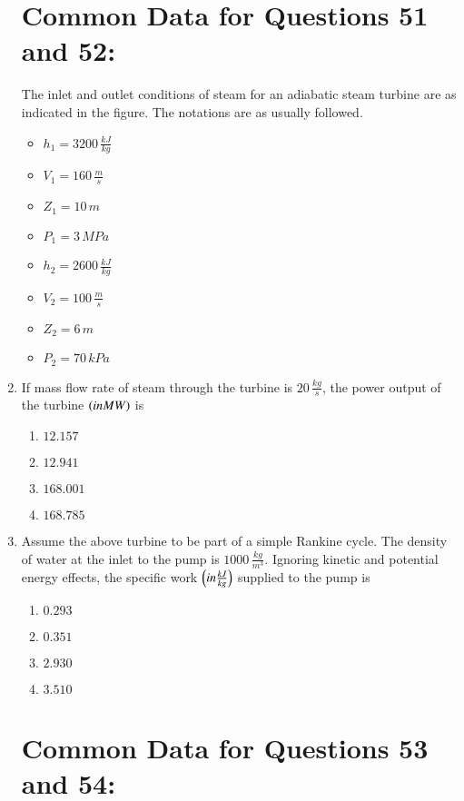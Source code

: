 \documentclass[journal,12pt,twocolumn]{IEEEtran}
\theoremstyle{remark}
\begin{document}
\begin{enumerate}[start=49]
  \section{  Common Data for Questions 51 and 52:}
    
    The inlet and outlet conditions of steam for an adiabatic steam turbine are as indicated in the figure. The notations are as usually followed.
    
    \begin{itemize}
        \item $h_1 = 3200 \, \frac{kJ}{kg}$
        \item $V_1 = 160 \, \frac{m}{s}$
        \item $Z_1 = 10 \, m$
        \item $P_1 = 3 \, MPa$
        \item $h_2 = 2600 \, \frac{kJ}{kg}$
        \item $V_2 = 100 \, \frac{m}{s}$
        \item $Z_2 = 6 \, m$
        \item $P_2 = 70 \, kPa$
    \end{itemize}

    \item If mass flow rate of steam through the turbine is $20 \, \frac{kg}{s}$, the power output of the turbine $\left(in 
 MW\right)$ is
    \begin{enumerate}
        \item $12.157$
        \item $12.941$
        \item $168.001$
        \item $168.785$
    \end{enumerate}

    \item Assume the above turbine to be part of a simple Rankine cycle. The density of water at the inlet to the pump is $1000 \, \frac{kg}{m^3}$. Ignoring kinetic and potential energy effects, the specific work $\left(in \frac{kJ}{kg}\right)$ supplied to the pump is
    \begin{enumerate}
        \item $0.293$
        \item $0.351$
        \item $2.930$
        \item $3.510$
    \end{enumerate}

   \section{ Common Data for Questions 53 and 54:}
    

\end{enumerate}
\end{document}
